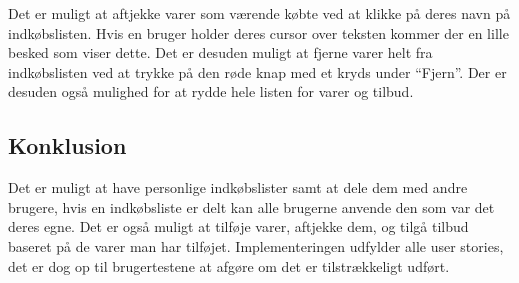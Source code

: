 Det er muligt at aftjekke varer som værende købte ved at klikke på deres navn på indkøbslisten. Hvis en bruger holder deres cursor over teksten kommer der en lille besked som viser dette. 
Det er desuden muligt at fjerne varer helt fra indkøbslisten ved at trykke på den røde knap med et kryds under ``Fjern''. 
Der er desuden også mulighed for at rydde hele listen for varer og tilbud.

\subsection{Konklusion}
Det er muligt at have personlige indkøbslister samt at dele dem med andre brugere, hvis en indkøbsliste er delt kan alle brugerne anvende den som var det deres egne. 
Det er også muligt at tilføje varer, aftjekke dem, og tilgå tilbud baseret på de varer man har tilføjet. 
Implementeringen udfylder alle user stories, det er dog op til brugertestene at afgøre om det er tilstrækkeligt udført. 
